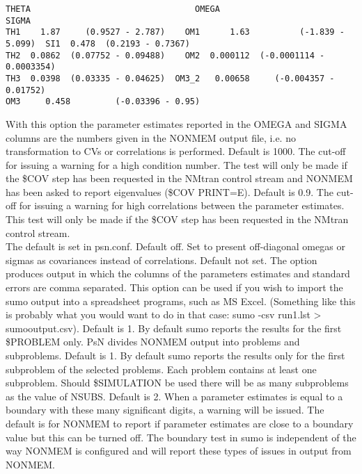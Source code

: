 \begin{optionlist}
\begin{verbatim}
THETA                                 OMEGA                                 SIGMA                     
TH1    1.87     (0.9527 - 2.787)    OM1      1.63          (-1.839 - 5.099)  SI1  0.478  (0.2193 - 0.7367)  
TH2  0.0862  (0.07752 - 0.09488)    OM2  0.000112  (-0.0001114 - 0.0003354)                                 
TH3  0.0398  (0.03335 - 0.04625)  OM3_2   0.00658     (-0.004357 - 0.01752)                                 
OM3     0.458         (-0.03396 - 0.95)
\end{verbatim}
With this option the parameter estimates reported in the OMEGA and SIGMA columns are the numbers given in the NONMEM output file, i.e. no transformation to CVs or correlations is performed. 
\nextopt
{}
Default is 1000. The cut-off for issuing a warning for a high condition number. The test will only be made if the \$COV step has been requested in the NMtran control stream and NONMEM has been asked to report eigenvalues (\$COV PRINT=E).
\nextopt
{}
Default is 0.9. The cut-off for issuing a warning for high correlations between the parameter estimates. This test will only be made if the \$COV step has been requested in the NMtran control stream. \\
The default is set in psn.conf. 
\nextopt
{}
    Default off. Set to present off-diagonal omegas or sigmas as covariances
    instead of correlations.
\nextopt
{}
Default not set. The option produces output in which the columns of the parameters estimates and standard errors are comma separated. This option can be used if you wish to import the sumo output into a spreadsheet programs, such as MS Excel. (Something like this is probably what you would want to do in that case: sumo -csv run1.lst > sumooutput.csv). 
\nextopt
{}
Default is 1. By default sumo reports the results for the first \$PROBLEM only. PsN divides NONMEM output into problems and subproblems.
\nextopt
{}
Default is 1. By default sumo reports the results only for the first subproblem of the selected problems. Each problem contains at least one subproblem. Should \$SIMULATION be used there will be as many subproblems as the value of NSUBS. 
\nextopt
\newpage
{}
Default is 2. When a parameter estimates is equal to a boundary with these many significant digits, a warning will be issued. The default is for NONMEM to report if parameter estimates are close to a boundary value but this can be turned off. The boundary test in sumo is independent of the way NONMEM is configured and will report these types of issues in output from NONMEM. 

\end{optionlist}
